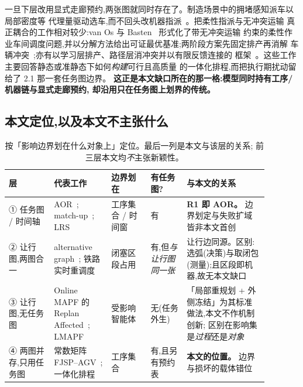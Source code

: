 \documentclass[manuscript,screen,review]{acmart}
\begin{document}
一旦下层改用显式走廊预约,两张图就同时存在了。制造场景中的拥堵感知派车以局部密度等
代理量驱动选车,而不回头改机器指派~\cite{kim2026congestion}。把柔性指派与无冲突运输
真正耦合的工作相对较少:van Os 与 Basten~\cite{vanos2026exact} 形式化了带无冲突运输
约束的柔性作业车间调度问题,并以分解方法给出可证最优基准;两阶段方案先固定排产再消解
车辆冲突~\cite{sun2023integrated};亦有以学习层排产、路径层消冲突并以有限反馈连接的
框架~\cite{li2026framework}。这些工作主要回答静态或准静态下如何\emph{构建}可行且高质量
的一体化排程,而把执行期扰动留给了 2.1 那一套任务图边界。
\textbf{这正是本文缺口所在的那一格:模型同时持有工序/机器链与显式走廊预约,
却沿用只在任务图上划界的传统。}

\subsection{本文定位,以及本文不主张什么}
\label{sec:rw_claim}

\begin{table}[t]
\centering
\caption{按「影响边界划在什么对象上」定位。最后一列是本文与该层的关系;
前三层本文均\emph{不}主张新颖性。}
\label{tab:position}
\small
\begin{tabular}{@{}p{0.155\linewidth}p{0.195\linewidth}p{0.135\linewidth}p{0.125\linewidth}p{0.275\linewidth}@{}}
\toprule
\textbf{层} & \textbf{代表工作} & \textbf{边界划在} & \textbf{有任务图?} & \textbf{与本文的关系} \\
\midrule
① 任务图 / 时间轴 &
AOR~\cite{li1993heuristic,abumaizar1997rescheduling,subramaniam2003maor};
match-up~\cite{bean1991matchup,akturk1999matchup}; LRS~\cite{kuster2007local} &
工序集合 / 时间窗 & 有 &
\textbf{R1 即 AOR。} 边界划定与失败扩域皆非本文首创 \\
\addlinespace[2pt]
② 让行图,两图合一 &
alternative graph~\cite{mascis2002alternative}; 铁路实时重调度~\cite{dariano2007branch} &
闭塞区段占用 & 有,但\emph{与让行图同一张} &
让行边同源。区别:选弧(决策)与取闭包(测量);且区段即机器,故无本文缺口 \\
\addlinespace[2pt]
③ 让行图,无任务图 &
Online MAPF 的 Replan Affected~\cite{svancara2019online,malka2024online};
LMAPF~\cite{zhang2024guidance} &
受影响智能体 & 无(任务外生) &
「局部重规划 + 外侧冻结」为其标准做法,本文不作机制创新;
区别在影响集是\emph{过程}还是\emph{对象} \\
\addlinespace[2pt]
④ 两图并存,只用任务图 &
常数矩阵 FJSP--AGV~\cite{xin2025review,meng2025cp,qin2026knowledge,fu2025integrated};
一体化排程~\cite{vanos2026exact,sun2023integrated,li2026framework} &
工序集合 & 有,且另有预约表 &
\textbf{本文的位置。} 边界与损坏的载体错位 \\
\bottomrule
\end{tabular}
\end{table}
\end{document}
